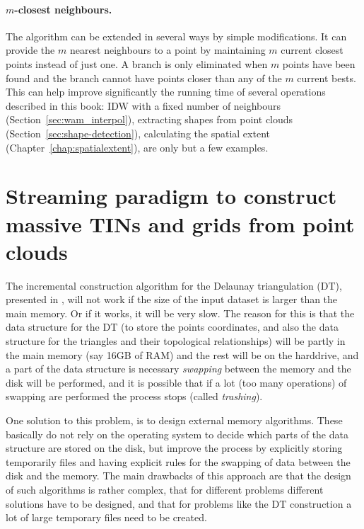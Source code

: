 \paragraph{$m$-closest neighbours.}
The algorithm can be extended in several ways by simple modifications. 
It can provide the $m$ nearest neighbours to a point by maintaining $m$ current closest points instead of just one. 
A branch is only eliminated when $m$ points have been found and the branch cannot have points closer than any of the $m$ current bests. 
This can help improve significantly the running time of several operations described in this book: IDW with a fixed number of neighbours (Section~\ref{sec:wam_interpol}), extracting shapes from point clouds (Section~\ref{sec:shape-detection}), calculating the spatial extent (Chapter~\ref{chap:spatialextent}), are only but a few examples.


%
\section[Streaming paradigm]{Streaming paradigm to construct massive TINs and grids from point clouds}%
\label{sec:streaming}

The incremental construction algorithm for the Delaunay triangulation (DT), presented in , will not work if the size of the input dataset is larger than the main memory.
Or if it works, it will be very slow.
The reason for this is that the data structure for the DT (to store the points coordinates, and also the data structure for the triangles and their topological relationships) will be partly in the main memory (say 16GB of RAM) and the rest will be on the harddrive, and a part of the data structure is necessary \emph{swapping}%
between the memory and the disk will be performed, and it is possible that if a lot (too many operations) of swapping are performed the process stops (called \emph{trashing}).

%

One solution to this problem, is to design external memory algorithms.%
These basically do not rely on the operating system to decide which parts of the data structure are stored on the disk, but improve the process by explicitly storing temporarily files and having explicit rules for the swapping of data between the disk and the memory. 
The main drawbacks of this approach are that the design of such algorithms is rather complex, that for different problems different solutions have to be designed, and that for problems like the DT construction a lot of large temporary files need to be created.

